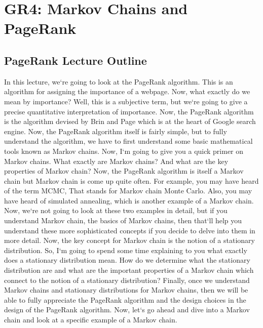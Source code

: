 \section{GR4: Markov Chains and PageRank}

\subsection{PageRank Lecture Outline}
In this lecture, we`re going to look at the PageRank algorithm.
This is an algorithm for assigning the importance of a webpage.
Now, what exactly do we mean by importance? Well, this is a subjective term, but we`re going to give a precise quantitative interpretation of importance.
Now, the PageRank algorithm is the algorithm devised by Brin and Page which is at the heart of Google search engine.
Now, the PageRank algorithm itself is fairly simple, but to fully understand the algorithm, we have to first understand some basic mathematical tools known as Markov chains.
Now, I`m going to give you a quick primer on Markov chains.
What exactly are Markov chains? And what are the key properties of Markov chain? Now, the PageRank algorithm is itself a Markov chain but Markov chain is come up quite often.
For example, you may have heard of the term MCMC, That stands for Markov chain Monte Carlo.
Also, you may have heard of simulated annealing, which is another example of a Markov chain.
Now, we`re not going to look at these two examples in detail, but if you understand Markov chain, the basics of Markov chains, then that`ll help you understand these more sophisticated concepts if you decide to delve into them in more detail.
Now, the key concept for Markov chain is the notion of a stationary distribution.
So, I`m going to spend some time explaining to you what exactly does a stationary distribution mean.
How do we determine what the stationary distribution are and what are the important properties of a Markov chain which connect to the notion of a stationary distribution? Finally, once we understand Markov chains and stationary distributions for Markov chains, then we will be able to fully appreciate the PageRank algorithm and the design choices in the design of the PageRank algorithm.
Now, let`s go ahead and dive into a Markov chain and look at a specific example of a Markov chain.

